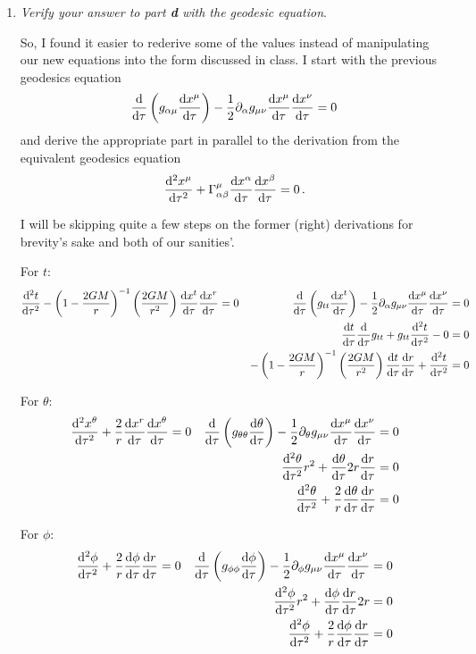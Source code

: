 \documentclass[11pt]{article}
\begin{document}
\begin{enumerate}[label=\alph*)]
\item \textit{Verify your answer to part \textbf{d} with the geodesic equation}.

So, I found it easier to rederive some of the values instead of manipulating our new equations into the form discussed in class. I start with the previous geodesics equation 
\[\dv{\tau} \left(g_{\alpha \mu}\dv{x^\mu}{\tau}\right) - \frac{1}{2}\partial_\alpha g_{\mu\nu}\dv{x^\mu}{\tau}\dv{x^\nu}{\tau} = 0\]
and derive the appropriate part in parallel to the derivation from the equivalent geodesics equation 
\[\dv[2]{x^\mu}{\tau} + \Gamma^\mu_{\alpha \beta}\dv{x^\alpha}{\tau}\dv{x^\beta}{\tau} = 0 \, .\]

I will be skipping quite a few steps on the former (right) derivations for brevity's sake and both of our sanities'.

For $t$:
\begin{align*}
\dv[2]{t}{\tau} - \left(1 - \frac{2GM}{r}\right)^{-1}\left(\frac{2GM}{r^2}\right)\dv{x^t}{\tau}\dv{x^r}{\tau} & = 0 & \dv{\tau}\left(g_{tt}\dv{x^t}{\tau}\right) - \frac{1}{2}\partial_\alpha g_{\mu\nu}\dv{x^\mu}{\tau}\dv{x^\nu}{\tau} & = 0\\
& & \dv{t}{\tau} \dv{\tau}g_{tt} + g_{tt}\dv[2]{t}{\tau} - 0 & = 0\\
& & -\left(1-\frac{2GM}{r}\right)^{-1}\left(\frac{2GM}{r^2}\right)\dv{t}{\tau}\dv{r}{\tau} + \dv[2]{t}{\tau} & = 0
\end{align*}

For $\theta$:
\begin{align*}
\dv[2]{x^\theta}{\tau} + \frac{2}{r}\dv{x^r}{\tau}\dv{x^\theta}{\tau} & = 0 & \dv{\tau}\left(g_{\theta\theta}\dv{\theta}{\tau}\right)-\frac{1}{2}\partial_\theta g_{\mu\nu}\dv{x^\mu}{\tau}\dv{x^\nu}{\tau} & = 0\\
& & \dv[2]{\theta}{\tau}r^2 + \dv{\theta}{\tau}2r \dv{r}{\tau} & = 0 \\
& & \dv[2]{\theta}{\tau} + \frac{2}{r}\dv{\theta}{\tau}\dv{r}{\tau} & = 0 
\end{align*}

For $\phi$:
\begin{align*}
\dv[2]{\phi}{\tau} + \frac{2}{r}\dv{\phi}{\tau}\dv{r}{\tau} & = 0 & \dv{\tau}\left(g_{\phi\phi}\dv{\phi}{\tau}\right)-\frac{1}{2}\partial_\phi g_{\mu\nu}\dv{x^\mu}{\tau}\dv{x^\nu}{\tau} & = 0\\
& & \dv[2]{\phi}{\tau}r^2 + \dv{\phi}{\tau}\dv{r}{\tau}2r & = 0\\
& & \dv[2]{\phi}{\tau} + \frac{2}{r}\dv{\phi}{\tau}\dv{r}{\tau} & = 0
\end{align*}


\end{enumerate}
\end{document}
